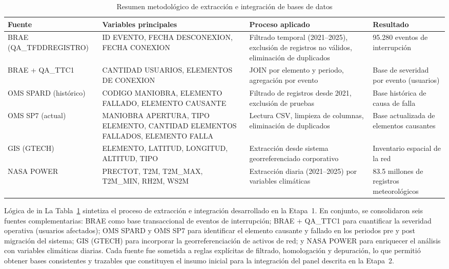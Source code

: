\begin{table}[ht]
\centering
\small
\caption{Resumen metodológico de extracción e integración de bases de datos}
\label{tab:data_lineage}
\begin{tabular}{p{3.5cm} p{3cm} p{3cm} p{3cm}}
\hline
\textbf{Fuente} & \textbf{Variables principales} & \textbf{Proceso aplicado} & \textbf{Resultado} \\
\hline

BRAE (QA\_TFDDREGISTRO) 
& ID EVENTO, FECHA DESCONEXION, FECHA CONEXION 
& Filtrado temporal (2021–2025), exclusión de registros no válidos, eliminación de duplicados 
& 95.280 eventos de interrupción \\

\hline

BRAE + QA\_TTC1 
& CANTIDAD USUARIOS, ELEMENTOS DE CONEXION 
& JOIN por elemento y periodo, agregación por evento 
& Base de severidad por evento (usuarios) \\

\hline

OMS SPARD (histórico) 
& CODIGO MANIOBRA, ELEMENTO FALLADO, ELEMENTO CAUSANTE 
& Filtrado de registros desde 2021, exclusión de pruebas 
& Base histórica de causa de falla \\

\hline

OMS SP7 (actual) 
& MANIOBRA APERTURA, TIPO ELEMENTO, CANTIDAD ELEMENTOS FALLADOS, ELEMENTO FALLA 
& Lectura CSV, limpieza de columnas, eliminación de duplicados 
& Base actualizada de elementos causantes \\

\hline

GIS (GTECH) 
& ELEMENTO, LATITUD, LONGITUD, ALTITUD, TIPO 
& Extracción desde sistema georreferenciado corporativo 
& Inventario espacial de la red \\

\hline

NASA POWER 
& PRECTOT, T2M, T2M\_MAX, T2M\_MIN, RH2M, WS2M 
& Extracción diaria (2021–2025) por variables climáticas 
& 83.5 millones de registros meteorológicos \\

\hline
\end{tabular}
\end{table}
Lógica de in
La Tabla~\ref{tab:data_lineage} sintetiza el proceso de extracción e integración desarrollado en la Etapa~1. En conjunto, se consolidaron seis fuentes complementarias: BRAE como base transaccional de eventos de interrupción; BRAE + QA\_TTC1 para cuantificar la severidad operativa (usuarios afectados); OMS SPARD y OMS SP7 para identificar el elemento causante y fallado en los periodos pre y post migración del sistema; GIS (GTECH) para incorporar la georreferenciación de activos de red; y NASA POWER para enriquecer el análisis con variables climáticas diarias. Cada fuente fue sometida a reglas explícitas de filtrado, homologación y depuración, lo que permitió obtener bases consistentes y trazables que constituyen el insumo inicial para la integración del panel descrita en la Etapa~2.





